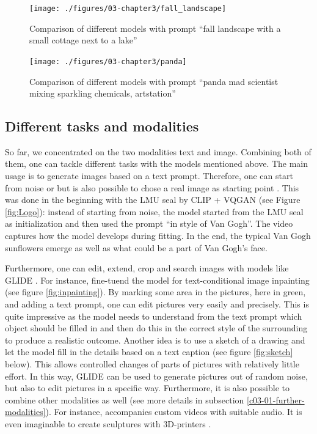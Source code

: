 \documentclass[
]{krantz}
\begin{document}
\begin{figure}

{\centering \texttt{[image: ./figures/03-chapter3/fall\_landscape]} 

}

\caption{Comparison of different models with prompt ``fall landscape with a small cottage next to a lake''}\label{fig:comparison1}
\end{figure}



\begin{figure}

{\centering \texttt{[image: ./figures/03-chapter3/panda]} 

}

\caption{Comparison of different models with prompt ``panda mad scientist mixing sparkling chemicals, artstation''}\label{fig:comparison2}
\end{figure}



\hypertarget{different-tasks-and-modalities}{%
\subsection{Different tasks and modalities}\label{different-tasks-and-modalities}}

So far, we concentrated on the two modalities text and image. Combining both of them, one can tackle different tasks with the models mentioned above. The main usage is to generate images based on a text prompt. Therefore, one can start from noise or but is also possible to chose a real image as starting point \citep{qiao2022initial}. This was done in the beginning with the LMU seal by CLIP + VQGAN (see Figure \ref{fig:Logo}): instead of starting from noise, the model started from the LMU seal as initialization and then used the prompt ``in style of Van Gogh''. The video captures how the model develops during fitting. In the end, the typical Van Gogh sunflowers emerge as well as what could be a part of Van Gogh's face.

Furthermore, one can edit, extend, crop and search images with models like GLIDE \citep{GLIDE}. For instance, \citet{GLIDE} fine-tuend the model for text-conditional image inpainting (see figure \ref{fig:inpainting}). By marking some area in the pictures, here in green, and adding a text prompt, one can edit pictures very easily and precisely. This is quite impressive as the model needs to understand from the text prompt which object should be filled in and then do this in the correct style of the surrounding to produce a realistic outcome. Another idea is to use a sketch of a drawing and let the model fill in the details based on a text caption (see figure \ref{fig:sketch} below). This allows controlled changes of parts of pictures with relatively little effort. In this way, GLIDE can be used to generate pictures out of random noise, but also to edit pictures in a specific way. Furthermore, it is also possible to combine other modalities as well (see more details in subsection \ref{c03-01-further-modalities}). For instance, \citet{WZRD} accompanies custom videos with suitable audio. It is even imaginable to create sculptures with 3D-printers \citep{3D}.
\end{document}
